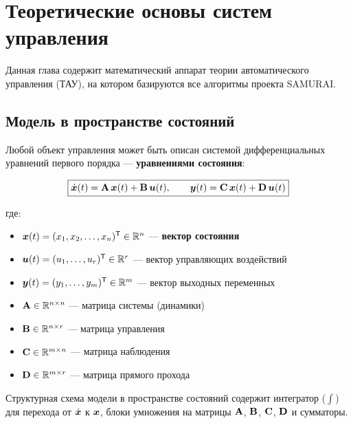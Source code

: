 \chapter{Теоретические основы систем управления}
\label{ch:theory}

Данная глава содержит математический аппарат теории автоматического
управления (ТАУ), на котором базируются все алгоритмы проекта SAMURAI.

\section{Модель в пространстве состояний}
\label{sec:state_space}

Любой объект управления может быть описан системой дифференциальных
уравнений первого порядка --- \textbf{уравнениями состояния}:

\begin{equation}
  \boxed{
  \dot{\bm{x}}(t) = \mathbf{A}\,\bm{x}(t) + \mathbf{B}\,\bm{u}(t), \qquad
  \bm{y}(t) = \mathbf{C}\,\bm{x}(t) + \mathbf{D}\,\bm{u}(t)
  }
  \label{eq:state_space}
\end{equation}

где:
\begin{itemize}
  \item $\bm{x}(t) = (x_1, x_2, \ldots, x_n)^{\mathsf{T}} \in \mathbb{R}^n$ --- \textbf{вектор состояния}
  \item $\bm{u}(t) = (u_1, \ldots, u_r)^{\mathsf{T}} \in \mathbb{R}^r$ --- вектор управляющих воздействий
  \item $\bm{y}(t) = (y_1, \ldots, y_m)^{\mathsf{T}} \in \mathbb{R}^m$ --- вектор выходных переменных
  \item $\mathbf{A} \in \mathbb{R}^{n \times n}$ --- матрица системы (динамики)
  \item $\mathbf{B} \in \mathbb{R}^{n \times r}$ --- матрица управления
  \item $\mathbf{C} \in \mathbb{R}^{m \times n}$ --- матрица наблюдения
  \item $\mathbf{D} \in \mathbb{R}^{m \times r}$ --- матрица прямого прохода
\end{itemize}

\begin{notebox}
Структурная схема модели в пространстве состояний содержит
интегратор ($\int$) для перехода от $\dot{\bm{x}}$ к $\bm{x}$,
блоки умножения на матрицы $\mathbf{A}$, $\mathbf{B}$, $\mathbf{C}$, $\mathbf{D}$
и сумматоры.
\end{notebox}

